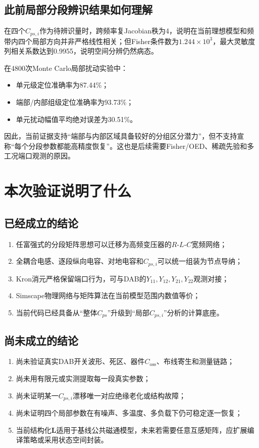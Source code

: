 \documentclass[UTF8,12pt,a4paper]{ctexart}
\newcommand{\Lmat}{\bm{L}}
\begin{document}
\subsection{此前局部分段辨识结果如何理解}
在四个\(C_{ps,i}\)作为待辨识量时，跨频率复Jacobian秩为4，说明在当前理想模型和频带内四个局部方向并非严格线性相关；但Fisher条件数为\(1.244\times10^3\)，最大灵敏度列相关系数达到0.9955，说明空间分辨仍然病态。

在4800次Monte Carlo局部扰动实验中：
\begin{itemize}
  \item 单元级定位准确率为87.44\%；
  \item 端部/内部组级定位准确率为93.73\%；
  \item 单元扰动幅值平均绝对误差为30.51\%。
\end{itemize}
因此，当前证据支持“端部与内部区域具备较好的分组区分潜力”，但不支持宣称“每个分段参数都能高精度恢复”。这也是后续需要Fisher/OED、稀疏先验和多工况端口观测的原因。

\section{本次验证说明了什么}

\subsection{已经成立的结论}
\begin{enumerate}
  \item 任富强式的分段矩阵思想可以迁移为高频变压器的\(R\)-\(L\)-\(C\)宽频网络；
  \item 全耦合电感、逐段纵向电容、对地电容和\(C_{ps,i}\)可以统一组装为节点导纳；
  \item Kron消元严格保留端口行为，可与DAB的\(Y_{11},Y_{12},Y_{21},Y_{22}\)观测对接；
  \item Simscape物理网络与矩阵算法在当前模型范围内数值等价；
  \item 当前代码已经具备从“整体\(C_{ps}\)”升级到“局部\(C_{ps,i}\)”分析的计算底座。
\end{enumerate}

\subsection{尚未成立的结论}
\begin{enumerate}
  \item 尚未验证真实DAB开关波形、死区、器件\(C_{\mathrm{oss}}\)、布线寄生和测量链路；
  \item 尚未用有限元或实测提取每一段真实参数；
  \item 尚未证明某一\(C_{ps,i}\)漂移唯一对应绝缘老化或结构故障；
  \item 尚未证明四个局部参数在有噪声、多温度、多负载下仍可稳定逐一恢复；
  \item 当前结构化\(\Lmat\)适用于基线公共磁通模型，未来若需要任意互感矩阵，应扩展编译策略或采用状态空间封装。
\end{enumerate}
\end{document}
